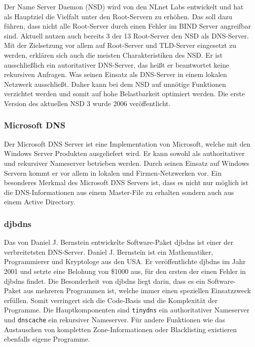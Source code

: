 \documentclass[a4paper, 12pt, BCOR10mm, DIV12, toc=bibliography, toc=listof, german]{scrbook}
\begin{document}
				Der Name Server Daemon (NSD) \cite{nsd} wird von den
				NLnet Labs entwickelt und hat als Hauptziel die Vielfalt unter den Root-Servern zu erhöhen.
				Das soll dazu führen, dass nicht alle Root-Server durch einen Fehler im BIND Server
				angreifbar sind. Aktuell nutzen auch bereits 3 der 13 Root-Server den NSD als DNS-Server.
				Mit der Zielsetzung vor allem auf Root-Server und TLD-Server eingesetzt zu werden, erklären
				sich auch die meisten Charakteristiken des NSD. Er ist ausschließlich ein autoritativer
				DNS-Server, das heißt er beantwortet keine rekursiven Anfragen. Was seinen Einsatz als
				DNS-Server in einem lokalen Netzwerk ausschließt. Daher kann bei dem NSD auf unnötige
				Funktionen verzichtet werden und somit auf hohe Belastbarkeit optimiert werden. Die erste
				Version des aktuellen NSD 3 wurde 2006 veröffentlicht.
				

				\subsubsection*{Microsoft DNS} %

				Der Microsoft DNS Server \cite{msdns} ist eine Implementation von Microsoft, welche mit den
				Windows Server Produkten ausgeliefert wird. Er kann sowohl als authoritativer und rekursiver
				Nameserver betrieben werden. Durch seinen Einsatz auf Windows Servern kommt er vor allem in
				lokalen und Firmen-Netzwerken vor. Ein besonderes Merkmal des Microsoft DNS Servers ist,
				dass es nicht nur möglich ist die DNS-Informationen aus einem Master-File zu erhalten
				sondern auch aus einem Active Directory.
				

				\subsubsection*{djbdns} %

				Das von Daniel J. Bernstein entwickelte Software-Paket djbdns \cite{djbdns} ist einer der
				verbreitetsten DNS-Server. Daniel J.  Bernstein ist ein Mathematiker, Programmierer und
				Kryptologe aus den USA. Er veröffentlichte djbdns im Jahr 2001 und setzte eine Belohung
				\cite{guarantee} von \$1000 aus, für den ersten der einen Fehler in djbdns findet. Die
				Besonderheit von djbdns liegt darin, dass es ein Software-Paket aus mehreren Programmen ist,
				welche immer einen speziellen Einsatzzweck erfüllen. Somit verringert sich die Code-Basis
				und die Komplexität der Programme. Die Hauptkomponenten sind \texttt{tinydns} ein
				authoritativer Nameserver und \texttt{dnscache} ein rekursiver Nameserver. Für andere
				Funktionen wie das Austauschen von kompletten Zone-Informationen oder Blacklisting
				existieren ebenfalls eigene Programme.
				
\end{document}
